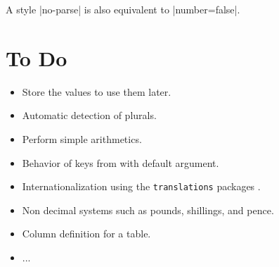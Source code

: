 \documentclass[12pt,add-index]{cnltx-doc}
\begin{document}
A style \verbcode|no-parse| is also equivalent to \verbcode|number=false|.







\section{To Do}

\begin{itemize}
    \item Store the values to use them later. 
    \item Automatic detection of plurals.
    \item Perform simple arithmetics.
    \item Behavior of  keys from  with default argument.
    \item Internationalization using the \texttt{translations} packages \cite{translations}.
    \item Non decimal systems such as pounds, shillings, and pence.
    \item Column definition for a table.
    \item ...
\end{itemize}


\printbibliography
\end{document}
